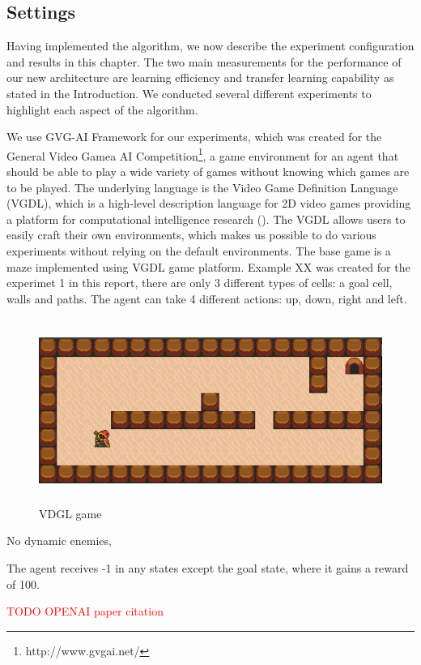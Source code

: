 
\subsection{Settings}
Having implemented the algorithm, we now describe the experiment configuration and results in this chapter.
The two main measurements for the performance of our new architecture are learning efficiency and transfer learning capability as stated in the Introduction.
We conducted several different experiments to highlight each aspect of the algorithm.

We use GVG-AI Framework for our experiments, which was created for the General Video Gamea AI Competition\footnote{http://www.gvgai.net/}, 
a game environment for an agent that should be able to play a wide variety of games without knowing which games are to be played.
The underlying language is the Video Game Definition Language (VGDL), which is a high-level description language for 2D video games providing a platform for computational intelligence research (\cite{Schaul2013}).
The VGDL allows users to easily craft their own environments, which makes us possible to do various experiments without relying on the default environments.
The base game is a maze implemented using VGDL game platform. 
Example XX was created for the experimet 1 in this report, there are only 3 different types of cells: 
a goal cell, walls and paths. The agent can take 4 different actions: up, down, right and left.  

\begin{figure}[!htb]
\centering
\includegraphics[width=12.5cm, height=6cm]{./figures/experiment1}
\caption{VDGL game}
\label{proposed_architecture}
\end{figure}
    
No dynamic enemies,

The agent receives -1 in any states except the goal state, where it gains a reward of 100. 

\textcolor{red}{TODO OPENAI paper citation}

